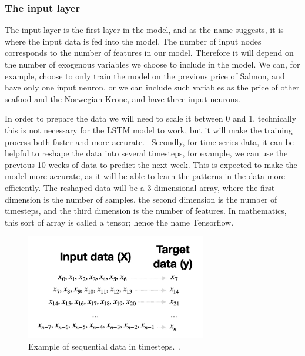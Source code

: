 \subsubsection{The input layer}
The input layer is the first layer in the model, and as the name suggests, it is where the input data is fed into the model. The number of input nodes corresponds to the number of features in our model. Therefore it will depend on the number of exogenous variables we choose to include in the model. We can, for example, choose to only train the model on the previous price of Salmon, and have only one input neuron, or we can include such variables as the price of other seafood and the Norwegian Krone, and have three input neurons. 

In order to prepare the data we will need to scale it between 0 and 1, technically this is not necessary for the LSTM model to work, but it will make the training process both faster and more accurate.~\parencite{brownlee_2019} Secondly, for time series data, it can be helpful to reshape the data into several timesteps, for example, we can use the previous 10 weeks of data to predict the next week. This is expected to make the model more accurate, as it will be able to learn the patterns in the data more efficiently. The reshaped data will be a 3-dimensional array, where the first dimension is the number of samples, the second dimension is the number of timesteps, and the third dimension is the number of features. In mathematics, this sort of array is called a tensor; hence the name Tensorflow.~\parencite{tensorflow_tensors_2023}
\begin{figure}[H]
    \centering
    \includegraphics[width=0.7\textwidth]{data/Figures/Neural networks/Sequential_data.png}
    \caption[Example of sequential data in timesteps.]{Example of sequential data in timesteps.~\cite{dobilas_2022}.}\label{fig:Sequential_data}
\end{figure}

